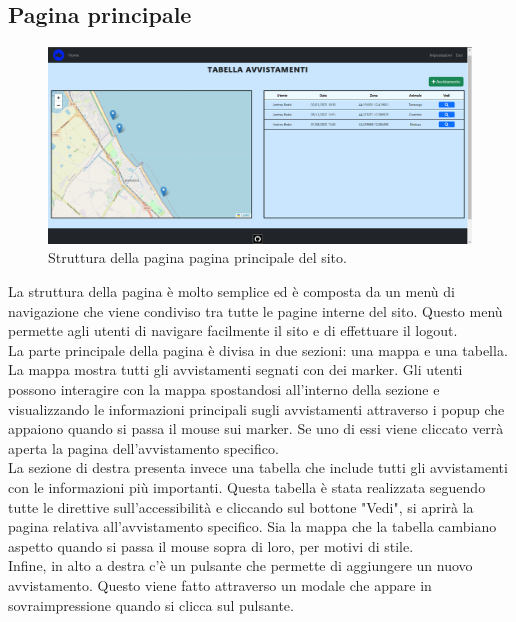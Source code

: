 \documentclass[a4paper,final,12pt]{report}
\begin{document}
\newpage

\subsection{Pagina principale}
\begin{figure}[hbtp]
\centering
\includegraphics[scale=0.31]{img_concettuale/tabellaAvv.png}
\caption{Struttura della pagina pagina principale del sito.}
\end{figure}
La struttura della pagina è molto semplice ed è composta da un menù di navigazione che viene condiviso tra tutte le pagine interne del sito. Questo menù permette agli utenti di navigare facilmente il sito e di effettuare il logout.\\
La parte principale della pagina è divisa in due sezioni: una mappa e una tabella. La mappa mostra tutti gli avvistamenti segnati con dei marker. Gli utenti possono interagire con la mappa spostandosi all'interno della sezione e visualizzando le informazioni principali sugli avvistamenti attraverso i popup che appaiono quando si passa il mouse sui marker. Se uno di essi viene cliccato verrà aperta la pagina dell'avvistamento specifico.\\
La sezione di destra presenta invece una tabella che include tutti gli avvistamenti con le informazioni più importanti. Questa tabella è stata realizzata seguendo tutte le direttive sull'accessibilità e cliccando sul bottone "Vedi", si aprirà la pagina relativa all'avvistamento specifico. Sia la mappa che la tabella cambiano aspetto quando si passa il mouse sopra di loro, per motivi di stile.\\
Infine, in alto a destra c'è un pulsante che permette di aggiungere un nuovo avvistamento. Questo viene fatto attraverso un modale che appare in sovraimpressione quando si clicca sul pulsante.
\end{document}
